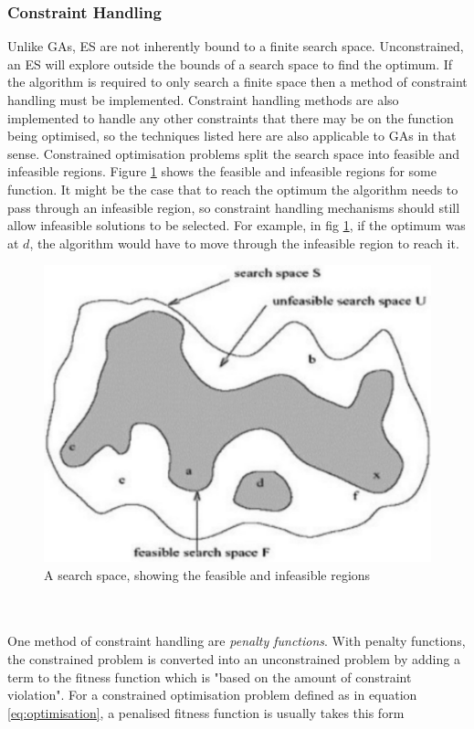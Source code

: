 \subsubsection{Constraint Handling}
\label{sec:constraints}
Unlike GAs, ES are not inherently bound to a finite search space. Unconstrained, an ES will explore outside the bounds of a search space to find the optimum. If the algorithm is required to only search a finite space then a method of constraint handling must be implemented. Constraint handling methods are also implemented to handle any other constraints that there may be on the function being optimised, so the techniques listed here are also applicable to GAs in that sense. Constrained optimisation problems split the search space into feasible and infeasible regions. Figure \ref{fig:feasible}\cite{constraints} shows the feasible and infeasible regions for some function. It might be the case that to reach the optimum the algorithm needs to pass through an infeasible region, so constraint handling mechanisms should still allow infeasible solutions to be selected. For example, in fig \ref{fig:feasible}, if the optimum was at $d$, the algorithm would have to move through the infeasible region to reach it.
\begin{figure}[tp]
   \begin{center}
     \includegraphics{Figures/feasible}
   \end{center}
   \caption{A search space, showing the feasible and infeasible regions}
   \label{fig:feasible}
\end{figure}
\\\\One method of constraint handling are \emph{penalty functions}. With penalty functions, the constrained problem is converted into an unconstrained problem by adding a term to the fitness function which is "based on the amount of constraint violation"\cite{gecco}. For a constrained optimisation problem defined as in equation \ref{eq:optimisation}, a penalised fitness function is usually takes this form\cite{4-ga, gecco}
